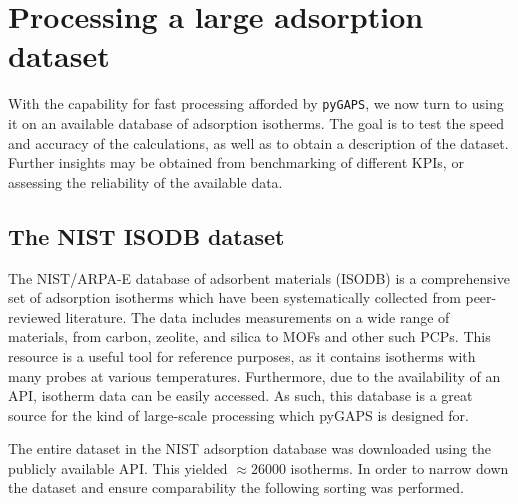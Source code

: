 
\section{Processing a large adsorption dataset}

With the capability for fast processing
afforded by \texttt{pyGAPS}, we now turn to using it on an
available database of adsorption isotherms. The goal is to
test the speed and accuracy of the calculations, as well
as to obtain a description of the dataset. Further insights
may be obtained from benchmarking of different \glspl{KPI}, or
assessing the reliability of the available data.

\subsection{The NIST ISODB dataset}

The \gls{NIST}/ARPA-E database of adsorbent materials (ISODB) is a 
comprehensive set of adsorption isotherms which have been systematically
collected from peer-reviewed literature. The data includes
measurements on a wide range of materials, from carbon, zeolite,
and silica to \glspl{MOF} and other such \glspl{PCP}. This resource is
a useful tool for reference purposes, as it contains isotherms with
many probes at various temperatures. Furthermore, due to the
availability of an \gls{API}, isotherm data can be easily
accessed. As such, this database is a great source for the kind of
large-scale processing which pyGAPS is designed for.

The entire dataset in the \gls{NIST} adsorption database was 
downloaded using the publicly available \gls{API}. This yielded 
\(\approx \! 26000\) isotherms.
In order to narrow down the dataset and ensure comparability
the following sorting was performed.

